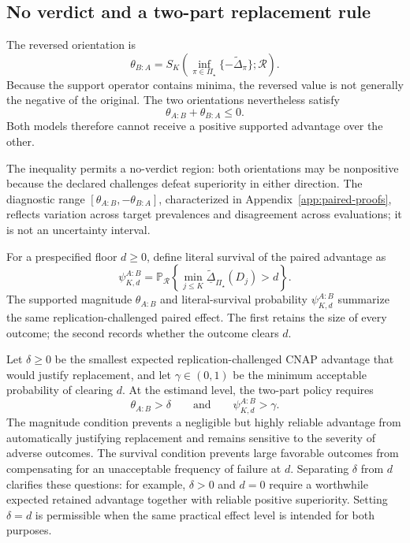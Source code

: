 \documentclass[11pt]{article}
\newcommand{\Regime}{\mathcal{R}}
\newcommand{\PSet}{\Pi_\star}
\newcommand{\Prb}{\mathbb{P}}
\newcommand{\Dta}{\widetilde{\Delta}}
\newcommand{\RobDta}{\underline{\widetilde{\Delta}}_{\PSet}}
\theoremstyle{remark}
\begin{document}
\subsection{No verdict and a two-part replacement rule}

The reversed orientation is
\[
\theta_{B:A}
=
S_K\left(
\inf_{\pi\in\PSet}\{-\Dta_\pi\};
\Regime
\right).
\]
Because the support operator contains minima, the reversed value is not generally the negative of the original. The two orientations nevertheless satisfy
\begin{equation}
\theta_{A:B}+\theta_{B:A}\leq0.
\label{eq:orientation}
\end{equation}
Both models therefore cannot receive a positive supported advantage over the other.

The inequality permits a no-verdict region: both orientations may be nonpositive because the declared challenges defeat superiority in either direction. The diagnostic range $[\theta_{A:B},-\theta_{B:A}]$, characterized in Appendix~\ref{app:paired-proofs}, reflects variation across target prevalences and disagreement across evaluations; it is not an uncertainty interval.

For a prespecified floor $d\geq0$, define literal survival of the paired advantage as
\begin{equation}
\psi^{A:B}_{K,d}
=
\Prb_{\Regime}
\left\{
\min_{j\leq K}\RobDta(D_j)>d
\right\}.
\label{eq:paired-literal-survival}
\end{equation}
The supported magnitude $\theta_{A:B}$ and literal-survival probability $\psi^{A:B}_{K,d}$ summarize the same replication-challenged paired effect. The first retains the size of every outcome; the second records whether the outcome clears $d$.

Let $\delta\geq0$ be the smallest expected replication-challenged CNAP advantage that would justify replacement, and let $\gamma\in(0,1)$ be the minimum acceptable probability of clearing $d$. At the estimand level, the two-part policy requires
\begin{equation}
\theta_{A:B}>\delta
\qquad\text{and}\qquad
\psi^{A:B}_{K,d}>\gamma.
\label{eq:replacement-targets}
\end{equation}
The magnitude condition prevents a negligible but highly reliable advantage from automatically justifying replacement and remains sensitive to the severity of adverse outcomes. The survival condition prevents large favorable outcomes from compensating for an unacceptable frequency of failure at $d$. Separating $\delta$ from $d$ clarifies these questions: for example, $\delta>0$ and $d=0$ require a worthwhile expected retained advantage together with reliable positive superiority. Setting $\delta=d$ is permissible when the same practical effect level is intended for both purposes.
\end{document}
